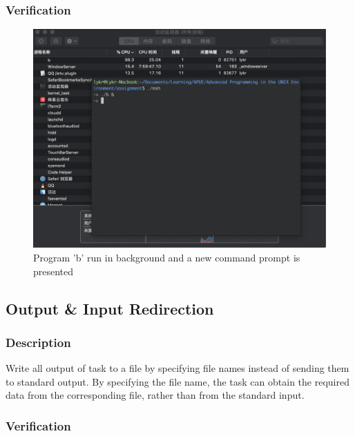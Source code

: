 \documentclass{article}
\begin{document}
\subsubsection{Verification}

\begin{figure}[h]
\centering
\includegraphics[scale=0.4]{fig/v3-1.png}
\caption{Program 'b' run in background and a new command prompt is presented}
\end{figure}

\newpage
\subsection{Output \& Input Redirection}

\subsubsection{Description}

Write all output of task to a file by specifying file names instead of sending them to standard output.
By specifying the file name, the task can obtain the required data from the corresponding file, rather than from the standard input.

\subsubsection{Verification}
\end{document}
